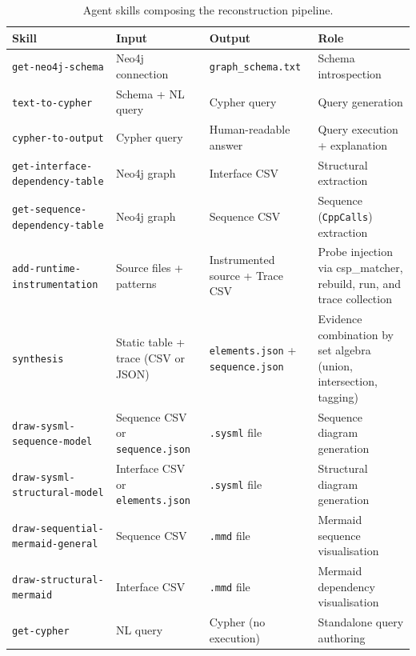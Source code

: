 \begin{table}[htb]
\centering
\caption{Agent skills composing the reconstruction pipeline.}
\label{tab:skills}
\small
{\renewcommand{\arraystretch}{1.6}
\begin{tabularx}{\textwidth}{@{} >{\ttfamily}p{} p{} p{} >{\raggedright\arraybackslash}X @{}}
\toprule
\textbf{Skill} & \textbf{Input} & \textbf{Output} & \textbf{Role} \\
\midrule
\texttt{get-neo4j-schema}
  & Neo4j connection
  & \texttt{graph\_schema.txt}
  & Schema introspection \\
\texttt{text-to-cypher}
  & Schema + NL query
  & Cypher query
  & Query generation \\
\texttt{cypher-to-output}
  & Cypher query
  & Human-readable answer
  & Query execution + explanation \\
\texttt{get-interface-dependency-table}
  & Neo4j graph
  & Interface CSV
  & Structural extraction \\
\texttt{get-sequence-dependency-table}
  & Neo4j graph
  & Sequence CSV
  & Sequence (\texttt{CppCalls}) extraction \\
\texttt{add-runtime-instrumentation}
  & Source files + patterns
  & Instrumented source + Trace CSV
  & Probe injection via csp\_matcher, rebuild, run, and trace collection \\
\texttt{synthesis}
  & Static table + trace (CSV or JSON)
  & \texttt{elements.json} + \texttt{sequence.json}
  & Evidence combination by set algebra (union, intersection, tagging) \\
\texttt{draw-sysml-sequence-model}
  & Sequence CSV or \texttt{sequence.json}
  & \texttt{.sysml} file
  & Sequence diagram generation \\
\texttt{draw-sysml-structural-model}
  & Interface CSV or \texttt{elements.json}
  & \texttt{.sysml} file
  & Structural diagram generation \\
\texttt{draw-sequential-mermaid-general}
  & Sequence CSV
  & \texttt{.mmd} file
  & Mermaid sequence visualisation \\
\texttt{draw-structural-mermaid}
  & Interface CSV
  & \texttt{.mmd} file
  & Mermaid dependency visualisation \\
\texttt{get-cypher}
  & NL query
  & Cypher (no execution)
  & Standalone query authoring \\
\bottomrule
\end{tabularx}}
\end{table}

